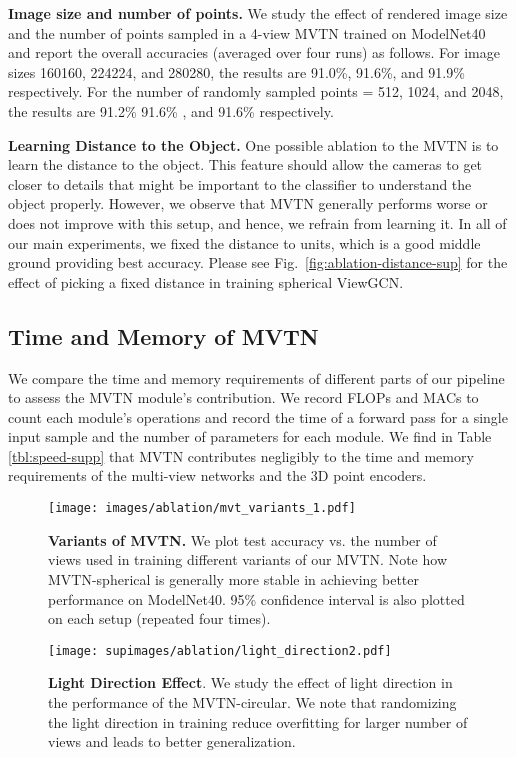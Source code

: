 \documentclass[10pt,twocolumn,letterpaper]{article}
\newcommand{\figLabel}{Fig.~}
\newcommand{\mysection}[1]{\noindent\textbf{#1.}}
\begin{document}
\mysection{Image size and number of points}
We study the effect of rendered image size and the number of points sampled in a 4-view MVTN trained on ModelNet40 and report the overall accuracies (averaged over four runs) as follows. For image sizes 160160, 224224, and 280280, the results are 91.0\%, 91.6\%, and 91.9\% respectively. For the number of randomly sampled points  = 512, 1024, and 2048, the results are 91.2\% 91.6\% , and 91.6\% respectively. 


\mysection{Learning Distance to the Object}
One possible ablation to the MVTN is to learn the distance to the object. This feature should allow the cameras to get closer to details that might be important to the classifier to understand the object properly. However, we observe that MVTN generally performs worse or does not improve with this setup, and hence, we refrain from learning it. In all of our main experiments, we fixed the distance to  units, which is a good middle ground providing best accuracy. Please see \figLabel{\ref{fig:ablation-distance-sup}} for the effect of picking a fixed distance in training spherical ViewGCN.  



\subsection{Time and Memory of MVTN}
We compare the time and memory requirements of different parts of our pipeline to assess the MVTN module's contribution. We record FLOPs and MACs to count each module's operations and record the time of a forward pass for a single input sample and the number of parameters for each module. We find in Table \ref{tbl:speed-supp} that MVTN  contributes negligibly to the time and memory requirements of the multi-view networks and the 3D point encoders. 

\begin{figure}[t]
    \centering
    \texttt{[image: images/ablation/mvt\_variants\_1.pdf]}
    \caption{\textbf{Variants of MVTN.} We plot test accuracy vs. the number of views used in training different variants of our MVTN. Note how MVTN-spherical is generally more stable in achieving better performance on ModelNet40. 95\% confidence interval is also plotted on each setup (repeated four times).}
    \label{fig:mvtn-variants}
\end{figure}
\begin{figure}[t]
    \centering
    \texttt{[image: supimages/ablation/light\_direction2.pdf]}
    \caption{\textbf{Light Direction Effect}. We study the effect of light direction in the performance of the MVTN-circular. We note that randomizing the light direction in training reduce overfitting for larger number of views and leads to better generalization.}
    \label{fig:ablation-light-sup}
\end{figure}
\end{document}
